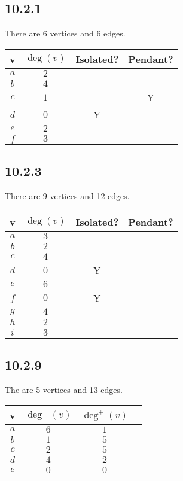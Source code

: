 \documentclass[12pt,titlepage]{extarticle}
\begin{document}
\subsection*{10.2.1}
There are 6 vertices and 6 edges.
\begin{center}
    \begin{tabular}{c|ccc}
        v & $\deg(v)$ & Isolated? & Pendant? \\\hline
        $a$ & $2$ &  & \\
        $b$ & $4$ & & \\
        $c$ & $1$ & & Y \\
        $d$ & $0$ & Y & \\
        $e$ & $2$ & & \\
        $f$ & $3$ & & \\
    \end{tabular}
\end{center}

\subsection*{10.2.3}
There are 9 vertices and 12 edges.
\begin{center}
    \begin{tabular}{c|ccc}
        v & $\deg(v)$ & Isolated? & Pendant? \\\hline
        $a$ & $3$ &  & \\
        $b$ & $2$ & & \\
        $c$ & $4$ & & \\
        $d$ & $0$ & Y & \\
        $e$ & $6$ & & \\
        $f$ & $0$ & Y & \\
        $g$ & $4$ & & \\
        $h$ & $2$ & & \\
        $i$ & $3$ & & \\
    \end{tabular}
\end{center}

\subsection*{10.2.9}
The are 5 vertices and 13 edges.
\begin{center}
    \begin{tabular}{c|ccc}
        v & $\deg^-(v)$ & $\deg^+(v)$ \\\hline
        $a$ & $6$ & $1$ \\
        $b$ & $1$ & $5$ \\
        $c$ & $2$ & $5$ \\
        $d$ & $4$ & $2$ \\
        $e$ & $0$ & $0$
    \end{tabular}
\end{center}
\end{document}
